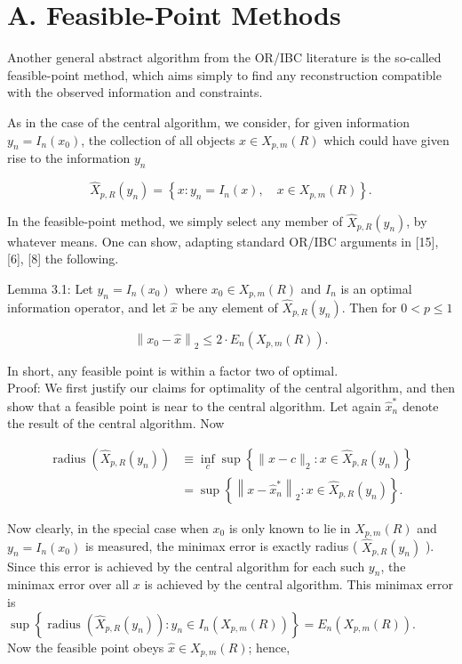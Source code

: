 \documentclass[10pt]{article}
\begin{document}
\section*{A. Feasible-Point Methods}
Another general abstract algorithm from the OR/IBC literature is the so-called feasible-point method, which aims simply to find any reconstruction compatible with the observed information and constraints.

As in the case of the central algorithm, we consider, for given information $y_{n}=I_{n}\left(x_{0}\right)$, the collection of all objects $x \in X_{p, m}(R)$ which could have given rise to the information $y_{n}$

$$
\hat{X}_{p, R}\left(y_{n}\right)=\left\{x: y_{n}=I_{n}(x), \quad x \in X_{p, m}(R)\right\} .
$$

In the feasible-point method, we simply select any member of $\hat{X}_{p, R}\left(y_{n}\right)$, by whatever means. One can show, adapting standard OR/IBC arguments in [15], [6], [8] the following.

Lemma 3.1: Let $y_{n}=I_{n}\left(x_{0}\right)$ where $x_{0} \in X_{p, m}(R)$ and $I_{n}$ is an optimal information operator, and let $\hat{x}$ be any element of $\hat{X}_{p, R}\left(y_{n}\right)$. Then for $0<p \leq 1$


\begin{equation*}
\left\|x_{0}-\hat{x}\right\|_{2} \leq 2 \cdot E_{n}\left(X_{p, m}(R)\right) . \tag{III.1}
\end{equation*}


In short, any feasible point is within a factor two of optimal.\\
Proof: We first justify our claims for optimality of the central algorithm, and then show that a feasible point is near to the central algorithm. Let again $\hat{x}_{n}^{*}$ denote the result of the central algorithm. Now

$$
\begin{aligned}
\operatorname{radius}\left(\hat{X}_{p, R}\left(y_{n}\right)\right) & \equiv \inf _{c} \sup \left\{\|x-c\|_{2}: x \in \hat{X}_{p, R}\left(y_{n}\right)\right\} \\
& =\sup \left\{\left\|x-\hat{x}_{n}^{*}\right\|_{2}: x \in \hat{X}_{p, R}\left(y_{n}\right)\right\} .
\end{aligned}
$$

Now clearly, in the special case when $x_{0}$ is only known to lie in $X_{p, m}(R)$ and $y_{n}=I_{n}\left(x_{0}\right)$ is measured, the minimax error is exactly radius ( $\hat{X}_{p, R}\left(y_{n}\right)$ ). Since this error is achieved by the central algorithm for each such $y_{n}$, the minimax error over all $x$ is achieved by the central algorithm. This minimax error is\\
$\sup \left\{\operatorname{radius}\left(\hat{X}_{p, R}\left(y_{n}\right)\right): y_{n} \in I_{n}\left(X_{p, m}(R)\right)\right\}=E_{n}\left(X_{p, m}(R)\right)$.\\
Now the feasible point obeys $\hat{x} \in X_{p, m}(R)$; hence,
\end{document}
